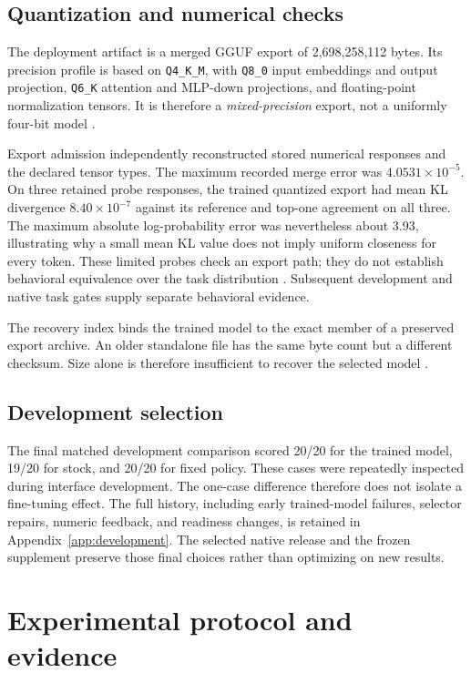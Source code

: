\documentclass[11pt,letterpaper]{article}
\begin{document}
\subsection{Quantization and numerical checks}

The deployment artifact is a merged GGUF export of 2,698,258,112 bytes.
Its precision profile is based on \texttt{Q4\_K\_M}, with \texttt{Q8\_0} input
embeddings and output projection, \texttt{Q6\_K} attention and MLP-down
projections, and floating-point normalization tensors. It is therefore a
\emph{mixed-precision} export, not a uniformly four-bit model
\cite{export}.

Export admission independently reconstructed stored numerical responses and
the declared tensor types. The maximum recorded merge error was
$4.0531\times10^{-5}$. On three retained probe responses, the trained quantized
export had mean KL divergence $8.40\times10^{-7}$ against its reference and
top-one agreement on all three. The maximum absolute log-probability error
was nevertheless about 3.93, illustrating why a small mean KL value does not
imply uniform closeness for every token. These limited probes check an export
path; they do not establish behavioral equivalence over the task distribution
\cite{export}. Subsequent development and native task gates supply separate
behavioral evidence.

The recovery index binds the trained model to the exact member of a preserved
export archive. An older standalone file has the same byte count but a
different checksum. Size alone is therefore insufficient to recover the
selected model \cite{recovery}.

\subsection{Development selection}

The final matched development comparison scored 20/20 for the trained model,
19/20 for stock, and 20/20 for fixed policy. These cases were repeatedly inspected
during interface development. The one-case difference therefore does not isolate
a fine-tuning effect. The full history, including early trained-model failures,
selector repairs, numeric feedback, and readiness changes, is retained in
Appendix~\ref{app:development}. The selected native release and the frozen
supplement preserve those final choices rather than optimizing on new results.

\section{Experimental protocol and evidence}
\label{sec:protocol}
\end{document}
